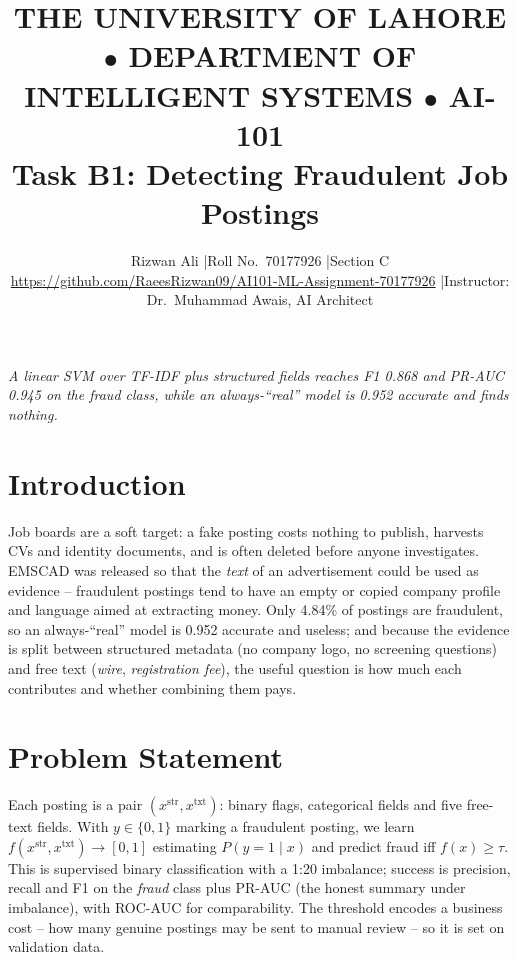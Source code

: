\documentclass[10pt,conference]{IEEEtran}
\begin{document}
\title{\vspace{-1.2em}\normalsize THE UNIVERSITY OF LAHORE $\bullet$ DEPARTMENT OF INTELLIGENT SYSTEMS $\bullet$ AI-101\\[2pt]
\Large Task B1: Detecting Fraudulent Job Postings}
\author{\normalsize Rizwan Ali \quad|\quad Roll No.\ 70177926 \quad|\quad Section C\\
\normalsize\url{https://github.com/RaeesRizwan09/AI101-ML-Assignment-70177926} \quad|\quad Instructor: Dr.\ Muhammad Awais, AI Architect}
\maketitle
\vspace{-1.4em}
\begin{center}\small\itshape A linear SVM over TF-IDF plus structured fields reaches F1 0.868 and PR-AUC 0.945 on the fraud class, while an always-``real'' model is 0.952 accurate and finds nothing.\end{center}
\vspace{-0.6em}

\section{Introduction}
Job boards are a soft target: a fake posting costs nothing to publish, harvests CVs and
identity documents, and is often deleted before anyone investigates. EMSCAD was released so
that the \emph{text} of an advertisement could be used as evidence -- fraudulent postings
tend to have an empty or copied company profile and language aimed at extracting money. Only
4.84\% of postings are fraudulent, so an always-``real'' model is
0.952 accurate and useless; and because the evidence is split between
structured metadata (no company logo, no screening questions) and free text (\emph{wire},
\emph{registration fee}), the useful question is how much each contributes and whether
combining them pays.

\section{Problem Statement}
Each posting is a pair $(x^{\text{str}},x^{\text{txt}})$: binary flags, categorical
fields and five free-text fields. With $y\in\{0,1\}$ marking a fraudulent posting, we learn
$f(x^{\text{str}},x^{\text{txt}})\to[0,1]$ estimating $P(y=1\mid x)$ and predict fraud
iff $f(x)\ge\tau$. This is supervised binary classification with a 1:20 imbalance; success is
precision, recall and F1 on the \emph{fraud} class plus PR-AUC (the honest summary under
imbalance), with ROC-AUC for comparability. The threshold encodes a business cost -- how
many genuine postings may be sent to manual review -- so it is set on validation data.
\end{document}
